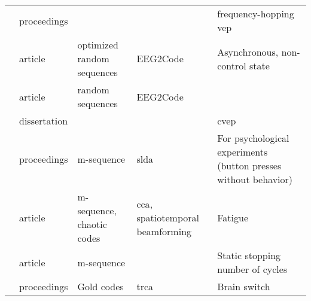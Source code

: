 \documentclass[a4paper,landscape]{article}
\begin{document}
\begin{table}[H]
\begin{tabular}{p{5cm}p{2cm}p{5cm}p{5cm}p{6.5cm}}
		\citeauthor{matsuno2019} & proceedings & & & frequency-hopping \acrshort{vep} \\
		\citeauthor{nagel2019a} & article & optimized random sequences & EEG2Code & Asynchronous, non-control state \\
		\citeauthor{nagel2019b} & article & random sequences & EEG2Code & \\
		\citeauthor{nagel2019c} & dissertation & & & \acrshort{cvep} \\
		\citeauthor{peng2019} & proceedings & m-sequence & \acrshort{slda} & For psychological experiments (button presses without behavior) \\
		\citeauthor{shirzhiyan2019} & article & m-sequence, chaotic codes & \acrshort{cca}, spatiotemporal beamforming & Fatigue \\
		\citeauthor{turi2019} & article & m-sequence & & Static stopping number of cycles \\
		\citeauthor{zheng2019} & proceedings & Gold codes & \acrshort{trca} & Brain switch \\
		\bottomrule
	\end{tabular}
\end{table}
\end{document}
